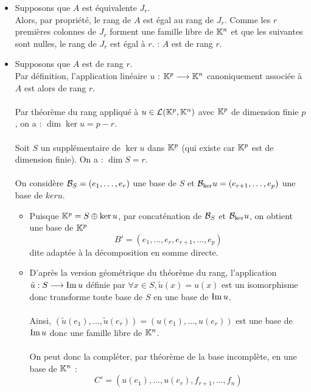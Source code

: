 \begin{dem}
    \begin{itemize}
        \item \imprec Supposons que \(A\) est équivalente \(J_r\).\\
        Alors, par propriété, le rang de \(A\) est égal au rang de \(J_r\). Comme les \(r\) premières colonnes de \(J_r\) forment une famille libre de \(\K^n\) et que les suivantes sont nulles, le rang de \(J_r\) est égal à \(r\).
        \conclusion : \(A\) est de rang \(r\).
        \item \impdir Supposons que \(A\) est de rang \(r\). \\
        Par définition, l’application linéaire \(u\) : \(\K^p \to \K^n\) canoniquement associée à \(A\) est alors de rang \(r\).\\~\\
        Par théorème du rang appliqué à \(u \in \cal{L}(\K^p, \K^n)\) avec \(\K^p\) de dimension finie \(p\), on a : \(\dim \ker u = p - r\).\\~\\
        Soit \(S\) un supplémentaire de \(\ker u\) dans \(\K^p\) (qui existe car \(\K^p\) est de dimension finie). On a : \(\dim S = r\).\\~\\
        On considère \(\cal{B}_S = (e_1, \dots , e_r)\) une base de \(S\) et \(\cal{B}_{\ker} u = (e_{r+1}, \dots , e_p)\) une base de \(ker u\).
        \begin{itemize}
            \item Puisque \(\K^p = S \oplus \ker u\), par concaténation de \(\cal{B}_S\) et \(\cal{B}_{\ker} u\), on obtient une base de \(\K^p\)
            \[B' = (e_1, \dots , e_r, e_{r+1}, \dots , e_p)\]
            dite adaptée à la décomposition en somme directe.
            \item D’après la version géométrique du théorème du rang, l’application \(\tilde{u} : S \to \im u\) définie par \(\forall x \in S, \tilde{u}(x) = u(x)\) est un isomorphisme donc transforme toute base de \(S\) en une base de \(\im u\).\\~\\
            Ainsi, \((\tilde{u}(e_1), \dots , \tilde{u}(e_r)) = (u(e_1), \dots , u(e_r))\) est une base de \(\im u\) donc une famille libre de \(\K^n\).\\~\\
            On peut donc la compléter, par théorème de la base incomplète, en une base de \(\K^n\) :
            \[C' = (u(e_1), \dots , u(e_r), f_{r+1}, \dots , f_n) \]

\end{itemize}
\end{itemize}
\end{dem}
